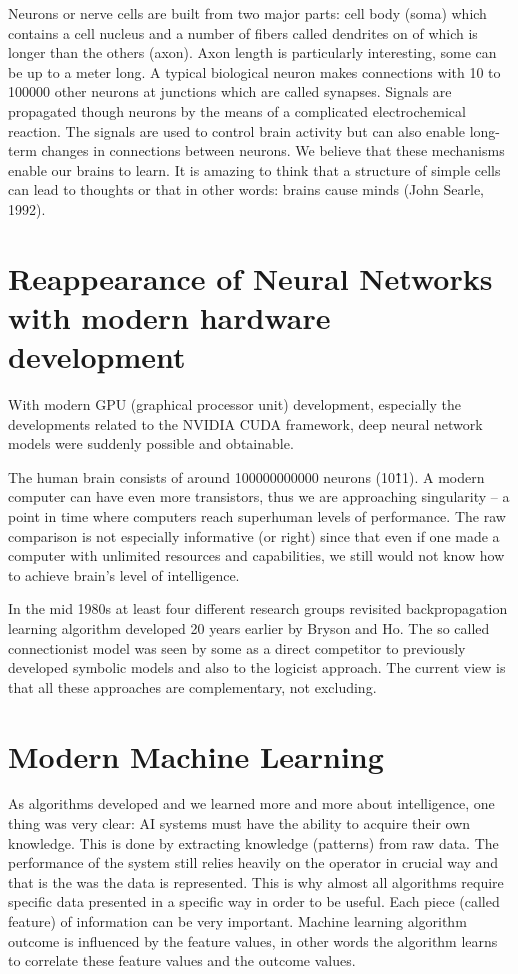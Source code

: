 \documentclass[b5paper]{book}
\begin{document}
Neurons or nerve cells are built from two major parts: cell body (soma) which contains a cell nucleus and a number of fibers called dendrites on of which is longer than the others (axon). Axon length is particularly interesting, some can be up to a meter long. A typical biological neuron makes connections with 10 to 100000 other neurons at junctions which are called synapses. Signals are propagated though neurons by the means of a complicated electrochemical reaction. The signals are used to control brain activity but can also enable long-term changes in connections between neurons. We believe that these mechanisms enable our brains to learn. It is amazing to think that a structure of simple cells can lead to thoughts or that in other words: brains cause minds (John Searle, 1992).

\section{Reappearance of Neural Networks with modern hardware development}

With modern GPU (graphical processor unit) development, especially the developments related to the NVIDIA CUDA framework, deep neural network models were suddenly possible and obtainable.

The human brain consists of around 100000000000 neurons (10\^11). A modern computer can have even more transistors, thus we are approaching singularity -- a point in time where computers reach superhuman levels of performance. The raw comparison is not especially informative (or right) since that even if one made a computer with unlimited resources and capabilities, we still would not know how to achieve brain's level of intelligence.

In the mid 1980s at least four different research groups revisited backpropagation learning algorithm developed 20 years earlier by Bryson and Ho. The so called connectionist model was seen by some as a direct competitor to previously developed symbolic models and also to the logicist approach. The current view is that all these approaches are complementary, not excluding.

\section{Modern Machine Learning}

As algorithms developed and we learned more and more about intelligence, one thing was very clear: AI systems must have the ability to acquire their own knowledge. This is done by extracting knowledge (patterns) from raw data. The performance of the system still relies heavily on the operator in crucial way and that is the was the data is represented. This is why almost all algorithms require specific data presented in a specific way in order to be useful. Each piece (called feature) of information can be very important. Machine learning algorithm outcome is influenced by the feature values, in other words the algorithm learns to correlate these feature values and the outcome values.
\end{document}
